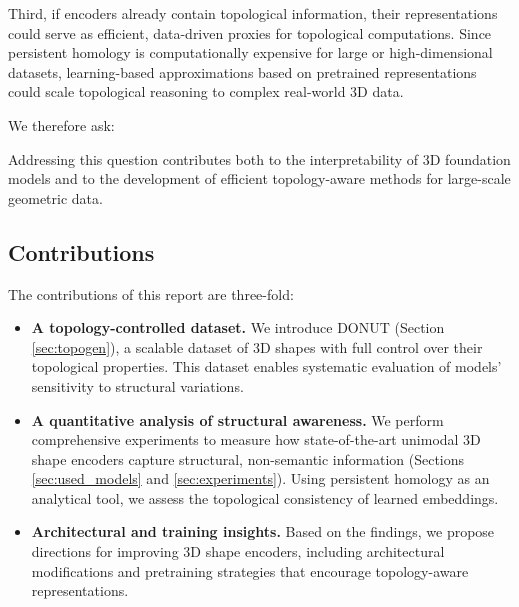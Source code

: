 Third, if encoders already contain topological information, their representations could serve as efficient, data-driven proxies for topological computations. Since persistent homology is computationally expensive for large or high-dimensional datasets, learning-based approximations based on pretrained representations could scale topological reasoning to complex real-world 3D data.

We therefore ask:

\begin{center}
\end{center}

Addressing this question contributes both to the interpretability of 3D foundation models and to the development of efficient topology-aware methods for large-scale geometric data.

\subsection{Contributions}

The contributions of this report are three-fold:

\begin{itemize}
    \item \textbf{A topology-controlled dataset.} We introduce DONUT (Section \ref{sec:topogen}), a scalable dataset of 3D shapes with full control over their topological properties. This dataset enables systematic evaluation of models’ sensitivity to structural variations.
    \item \textbf{A quantitative analysis of structural awareness.} We perform comprehensive experiments to measure how state-of-the-art unimodal 3D shape encoders capture structural, non-semantic information (Sections \ref{sec:used_models} and \ref{sec:experiments}). Using persistent homology as an analytical tool, we assess the topological consistency of learned embeddings.
    \item \textbf{Architectural and training insights.} Based on the findings, we propose directions for improving 3D shape encoders, including architectural modifications and pretraining strategies that encourage topology-aware representations.
\end{itemize}
